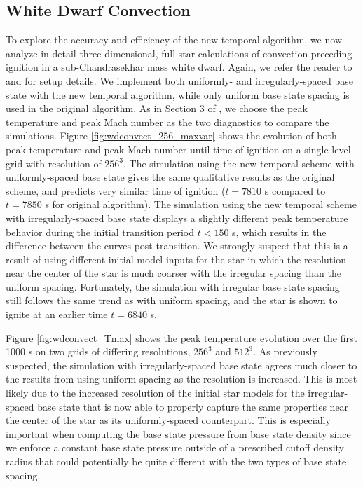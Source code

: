 \subsection{White Dwarf Convection}\label{sec:whitedwarf}

To explore the accuracy and efficiency of the new temporal algorithm, we now analyze in detail three-dimensional, full-star calculations of convection preceding ignition in a sub-Chandrasekhar mass white dwarf. Again, we refer the reader to \cite{MAESTRO_AMR} and \cite{MAESTRO_convection} for setup details. We implement both uniformly- and irregularly-spaced base state with the new temporal algorithm, while only uniform base state spacing is used in the original algorithm. As in Section 3 of \cite{MAESTRO_AMR}, we choose the peak temperature and peak Mach number as the two diagnostics to compare the simulations. Figure \ref{fig:wdconvect_256_maxvar} shows the evolution of both peak temperature and peak Mach number until time of ignition on a single-level grid with resolution of $256^3$. The simulation using the new temporal scheme with uniformly-spaced base state gives the same qualitative results as the original scheme, and predicts very similar time of ignition ($t=7810$ s compared to $t=7850$ s for original algorithm). The simulation using the new temporal scheme with irregularly-spaced base state displays a slightly different peak temperature behavior during the initial transition period $t<150$ s, which results in the difference between the curves post transition. We strongly suspect that this is a result of using different initial model inputs for the star in which the resolution near the center of the star is much coarser with the irregular spacing than the uniform spacing. Fortunately, the simulation with irregular base state spacing still follows the same trend as with uniform spacing, and the star is shown to ignite at an earlier time $t=6840$ s. 

Figure \ref{fig:wdconvect_Tmax} shows the peak temperature evolution over the first 1000 s on two grids of differing resolutions, $256^3$ and $512^3$. As previously suspected, the simulation with irregularly-spaced base state agrees much closer to the results from using uniform spacing as the resolution is increased. This is most likely due to the increased resolution of the initial star models for the irregular-spaced base state that is now able to properly capture the same properties near the center of the star as its uniformly-spaced counterpart. This is especially important when computing the base state pressure from base state density since we enforce a constant base state pressure outside of a prescribed cutoff density radius that could potentially be quite different with the two types of base state spacing.

